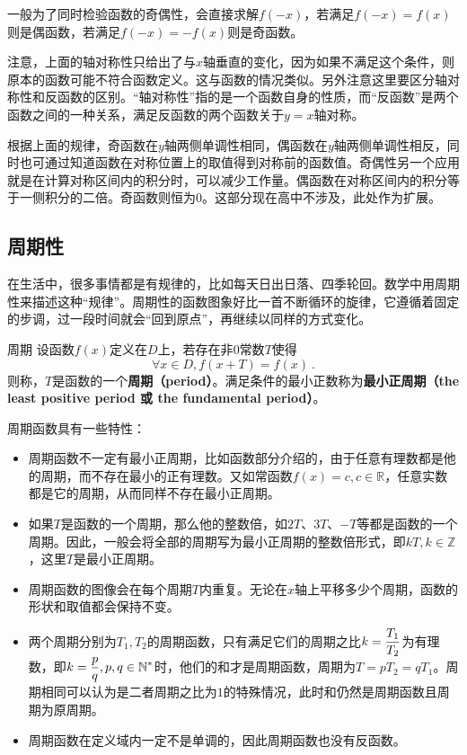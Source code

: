 一般为了同时检验函数的奇偶性，会直接求解$f(-x)$，若满足$f(-x)=f(x)$则是偶函数，若满足$f(-x)=-f(x)$则是奇函数。

注意，上面的轴对称性只给出了与$x$轴垂直的变化，因为如果不满足这个条件，则原本的函数可能不符合函数定义。这与函数的情况类似。另外注意这里要区分轴对称性和反函数的区别。“轴对称性”指的是一个函数自身的性质，而“反函数”是两个函数之间的一种关系，满足反函数的两个函数关于$y=x$轴对称。

根据上面的规律，奇函数在$y$轴两侧单调性相同，偶函数在$y$轴两侧单调性相反，同时也可通过知道函数在对称位置上的取值得到对称前的函数值。奇偶性另一个应用就是在计算对称区间内的积分时，可以减少工作量。偶函数在对称区间内的积分等于一侧积分的二倍。奇函数则恒为0。这部分现在高中不涉及，此处作为扩展。

\subsection{周期性}

在生活中，很多事情都是有规律的，比如每天日出日落、四季轮回。数学中用周期性来描述这种“规律”。周期性的函数图象好比一首不断循环的旋律，它遵循着固定的步调，过一段时间就会“回到原点”，再继续以同样的方式变化。

\begin{definition}{周期}
设函数$f(x)$定义在$D$上，若存在非$0$常数$T$使得
\begin{equation}
\forall x\in D,f(x+T)=f(x)~.
\end{equation}
则称，$T$是函数的一个\textbf{周期（period）}。满足条件的最小正数称为\textbf{最小正周期（the least positive period 或 the fundamental period）}。
\end{definition}

周期函数具有一些特性：
\begin{itemize}
\item 周期函数不一定有最小正周期，比如函数部分介绍的，由于任意有理数都是他的周期，而不存在最小的正有理数。又如常函数$f(x)=c,c\in\mathbb{R}$，任意实数都是它的周期，从而同样不存在最小正周期。
\item 如果$T$是函数的一个周期，那么他的整数倍，如$2T$、$3T$、$-T$等都是函数的一个周期。因此，一般会将全部的周期写为最小正周期的整数倍形式，即$kT,k\in \mathbb{Z}$，这里$T$是最小正周期。
\item 周期函数的图像会在每个周期$T$内重复。无论在$x$轴上平移多少个周期，函数的形状和取值都会保持不变。
\item 两个周期分别为$T_1,T_2$的周期函数，只有满足它们的周期之比$\displaystyle k={T_1\over T_2}$为有理数，即$\displaystyle k={p\over q},p,q\in\mathbb{N}^*$时，他们的和才是周期函数，周期为$T=pT_2=qT_1$。周期相同可以认为是二者周期之比为$1$的特殊情况，此时和仍然是周期函数且周期为原周期。
\item 周期函数在定义域内一定不是单调的，因此周期函数也没有反函数。
\end{itemize}

